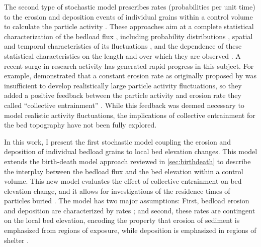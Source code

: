 The second type of stochastic model prescribes rates (probabilities per unit time) to the erosion and deposition events of individual grains within a control volume to calculate the particle activity \citep{Einstein1950}.
These approaches aim at a complete statistical characterization of the bedload flux \citep{Furbish2012a,Fathel2015,Furbish2017,Heyman2016}, including probability distributions \citep{Ancey2006,Ancey2008}, spatial and temporal characteristics of its fluctuations \citep{Heyman2014a, Roseberry2012,Dhont2018}, and the dependence of these statistical characteristics on the length and \DIFdelbegin {}\DIFdelend \DIFaddbegin {}\DIFaddend over which they are observed \citep{Singh2009,Singh2012,Saletti2015}.
A recent surge in research activity has generated rapid progress in this subject. 
For example, \citet{Ancey2006} demonstrated that a constant erosion rate as originally proposed by \citet{Einstein1950} was insufficient to develop realistically large particle activity fluctuations, so they added a positive feedback between the particle activity and erosion rate they called ``collective entrainment'' \citep{Ancey2008, Heyman2013,Heyman2014, Lee2018}.
While this feedback was deemed necessary to model realistic activity fluctuations, the implications of collective entrainment for the bed topography have not been fully explored.

In this work, I present the first stochastic model coupling the erosion and deposition of individual bedload grains to local bed elevation changes.
This model extends the birth-death model approach reviewed in \DIFdelbegin {}\DIFdelend \DIFaddbegin {}\DIFaddend \ref{sec:birthdeath} to describe the interplay between the bedload flux and the bed elevation within a control volume.
This new model evaluates the effect of collective entrainment on bed elevation change, and it allows for investigations of the residence times of particles buried \DIFdelbegin {}\DIFdelend \DIFaddbegin {}\DIFaddend .
The model has two major assumptions: First, bedload erosion and deposition are characterized by \DIFdelbegin {}\DIFdelend \DIFaddbegin {}\DIFaddend rates \citep{Einstein1950, Ancey2008}; and second, these rates are contingent on the local bed elevation, encoding the property that erosion of sediment is emphasized from regions of exposure, while deposition is emphasized in regions of shelter \citep{Sawai1987, Wong2007}.

